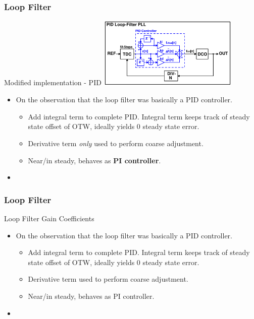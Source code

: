 \documentclass[t, screen, aspectratio=43]{beamer}
\begin{document}
\begin{frame}
	\frametitle{Loop Filter}
	\begin{block}{Modified implementation - PID}
		\vspace{-0.5em}
		\center\includegraphics[width=0.5\textwidth, angle=0]{pid_pll.pdf}
		\vspace{-0.5em}
		\begin{itemize}
			\footnotesize
			\item On the observation that the loop filter was basically a PID controller.
			\begin{itemize}
				\scriptsize
				\item Add integral term to complete PID. Integral term keeps track of steady state offset of OTW, ideally yields 0 steady state error. 
				\item Derivative term \textit{only} used to perform coarse adjustment.
				\item Near/in steady, behaves as \textbf{PI controller}. 
			\end{itemize}
			\item 
		\end{itemize} 	 
	\end{block}
\end{frame}


\begin{frame}
	\frametitle{Loop Filter}
	\begin{block}{Loop Filter Gain Coefficients}
		\begin{itemize}
			\footnotesize
			\item On the observation that the loop filter was basically a PID controller.
			\begin{itemize}
				\scriptsize
				\item Add integral term to complete PID. Integral term keeps track of steady state offset of OTW, ideally yields 0 steady state error. 
				\item Derivative term used to perform coarse adjustment.
				\item Near/in steady, behaves as PI controller. 
			\end{itemize}
			\item 
		\end{itemize} 	 
	\end{block}
\end{frame}
\end{document}
